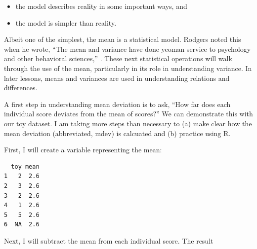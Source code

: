 \documentclass[
  11pt,
]{book}
\newenvironment{Shaded}{\begin{snugshade}}{\end{snugshade}}
\newcommand{\AttributeTok}[1]{\textcolor[rgb]{0.77,0.63,0.00}{#1}}
\newcommand{\CommentTok}[1]{\textcolor[rgb]{0.56,0.35,0.01}{\textit{#1}}}
\newcommand{\ConstantTok}[1]{\textcolor[rgb]{0.00,0.00,0.00}{#1}}
\newcommand{\FunctionTok}[1]{\textcolor[rgb]{0.00,0.00,0.00}{#1}}
\newcommand{\NormalTok}[1]{#1}
\newcommand{\OtherTok}[1]{\textcolor[rgb]{0.56,0.35,0.01}{#1}}
\newcommand{\SpecialCharTok}[1]{\textcolor[rgb]{0.00,0.00,0.00}{#1}}
\providecommand{\tightlist}{%
  \setlength{\itemsep}{0pt}\setlength{\parskip}{0pt}}
\begin{document}
\begin{itemize}
\tightlist
\item
  the model describes reality in some important ways, and
\item
  the model is simpler than reality.
\end{itemize}

Albeit one of the simplest, the mean is a statistical model. Rodgers noted this when he wrote, ``The mean and variance have done yeoman service to psychology and other behavioral sciences,'' \citeyearpar[p.~4]{rodgers_epistemology_2010}. These next statistical operations will walk through the use of the mean, particularly in its role in understanding variance. In later lessons, means and variances are used in understanding relations and differences.

A first step in understanding mean deviation is to ask, ``How far does each individual score deviates from the mean of scores?'' We can demonstrate this with our toy dataset. I am taking more steps than necessary to (a) make clear how the mean deviation (abbreviated, mdev) is calcuated and (b) practice using R.

First, I will create a variable representing the mean:

\begin{Shaded}
\end{Shaded}

\begin{verbatim}
  toy mean
1   2  2.6
2   3  2.6
3   2  2.6
4   1  2.6
5   5  2.6
6  NA  2.6
\end{verbatim}

Next, I will subtract the mean from each individual score. The result

\begin{Shaded}
\end{Shaded}
\end{document}
